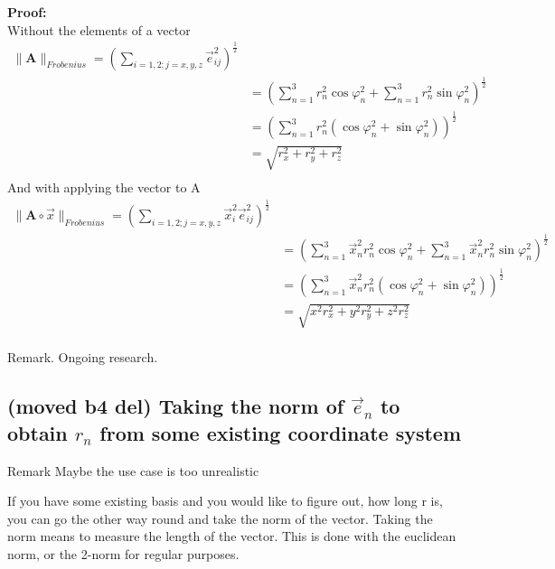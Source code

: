 \documentclass[a4paper]{article}
\begin{document}
\textbf{Proof:}\\
Without the elements of a vector 
\begin{displaymath}
\begin{align}
\|\boldsymbol{A}\|_{Frobenius} = (\sum_{i=1,2;j=x,y,z}\vec{e}_{ij}^{2})^{\frac{1}{2}} \\
&= (\sum_{n=1}^{3}r_{n}^{2}\cos\varphi_n^{2} + \sum_{n=1}^{3}r_{n}^{2}\sin\varphi_n^{2})^{\frac{1}{2}}\\
&= (\sum_{n=1}^{3}r_{n}^{2}(\cos\varphi_n^{2} + \sin\varphi_n^{2}))^{\frac{1}{2}}\\
&= \sqrt{r_{x}^{2}+r_{y}^{2}+r_{z}^{2}}\\
\end{align}
\end{displaymath}
And with applying the vector to A
\begin{displaymath}
\begin{align}
\|\boldsymbol{A}\circ\vec{x}\|_{Frobenius} = (\sum_{i=1,2;j=x,y,z}\vec{x}_{i}^{2}\vec{e}_{ij}^{2})^{\frac{1}{2}} \\
&= (\sum_{n=1}^{3}\vec{x}_{n}^{2}r_{n}^{2}\cos\varphi_n^{2} + \sum_{n=1}^{3}\vec{x}_{n}^{2}r_{n}^{2}\sin\varphi_n^{2})^{\frac{1}{2}}\\
&= (\sum_{n=1}^{3}\vec{x}_{n}^{2}r_{n}^{2}(\cos\varphi_n^{2} + \sin\varphi_n^{2}))^{\frac{1}{2}}\\
&= \sqrt{x^{2}r_{x}^{2}+y^{2}r_{y}^{2}+z^{2}r_{z}^{2}}\\
\end{align}
\end{displaymath}

Remark. Ongoing research.









\subsection{(moved b4 del) Taking the norm of $\vec{e}_n$ to obtain $r_n$ from some existing coordinate system}

Remark Maybe the use case is too unrealistic

If you have some existing basis and you would like to figure out, how long r is, you can go the other way round and take the
norm of the vector. Taking the norm means to measure the length of the vector. This is done with the euclidean norm, or the
2-norm for regular purposes.\\
\end{document}
